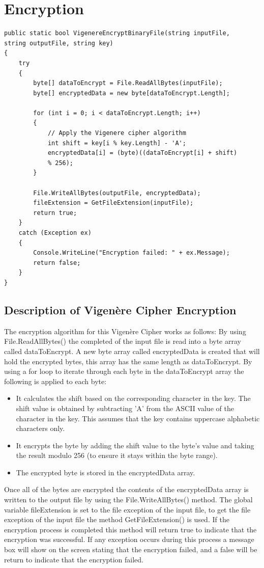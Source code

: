 \documentclass[a4paper,oneside,11pt]{book}
\begin{document}
\section{Encryption}
\begin{lstlisting}[language=Csh, caption={Code for Vigenère Cipher Encryption}]
public static bool VigenereEncryptBinaryFile(string inputFile, 
string outputFile, string key)
{
    try
    {
        byte[] dataToEncrypt = File.ReadAllBytes(inputFile);
        byte[] encryptedData = new byte[dataToEncrypt.Length];

        for (int i = 0; i < dataToEncrypt.Length; i++)
        {
            // Apply the Vigenere cipher algorithm
            int shift = key[i % key.Length] - 'A'; 
            encryptedData[i] = (byte)((dataToEncrypt[i] + shift) 
            % 256);
        }

        File.WriteAllBytes(outputFile, encryptedData);
        fileExtension = GetFileExtension(inputFile);
        return true;
    }
    catch (Exception ex)
    {
        Console.WriteLine("Encryption failed: " + ex.Message);
        return false;
    }
}
\end{lstlisting}

\subsection{Description of Vigenère Cipher Encryption}

The encryption algorithm for this Vigenère Cipher works as follows:
By using File.ReadAllBytes() the completed of the input file is read into a byte array called dataToEncrypt. A new byte array called encryptedData is created that will hold the encrypted bytes, this array has the same length as dataToEncrypt. By using a for loop to iterate through each byte in the dataToEncrypt array the following is applied to each byte:
\begin{itemize}
    \item 
        It calculates the shift based on the corresponding character in the key. The shift value is obtained by subtracting 'A' from the ASCII value of the character in the key. This assumes that the key contains uppercase alphabetic characters only.
    \item 
        It encrypts the byte by adding the shift value to the byte's value and taking the result modulo 256 (to ensure it stays within the byte range).
    \item 
        The encrypted byte is stored in the encryptedData array.
\end{itemize}
Once all of the bytes are encrypted the contents of the encryptedData array is written to the output file by using the File.WriteAllBytes() method. The global variable fileExtension is set to the file exception of the input file, to get the file exception of the input file the method GetFileExtension() is used. If the encryption process is completed this method will return true to indicate that the encryption was successful. If any exception occurs during this process a message box will show on the screen stating that the encryption failed, and a false will be return to indicate that the encryption failed.
\end{document}

